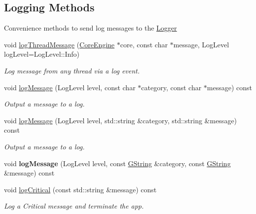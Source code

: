 \subsection*{Logging Methods}
\label{_amgrpef874cc21cf638ab7bb558a628e3450c}%
Convenience methods to send log messages to the \mbox{\hyperlink{classrev_1_1_logger}{Logger}} \begin{DoxyCompactItemize}
\item 
\mbox{\label{classrev_1_1_object_a01101d7b1f4b4e69487a97428902a8f6}} 
void \mbox{\hyperlink{classrev_1_1_object_a01101d7b1f4b4e69487a97428902a8f6}{log\+Thread\+Message}} (\mbox{\hyperlink{classrev_1_1_core_engine}{Core\+Engine}} $\ast$core, const char $\ast$message, Log\+Level log\+Level=Log\+Level\+::\+Info)
\begin{DoxyCompactList}\small\item\em Log message from any thread via a log event. \end{DoxyCompactList}\item 
void \mbox{\hyperlink{classrev_1_1_object_a763fca366d830bfdab969e164420d7ed}{log\+Message}} (Log\+Level level, const char $\ast$category, const char $\ast$message) const
\begin{DoxyCompactList}\small\item\em Output a message to a log. \end{DoxyCompactList}\item 
void \mbox{\hyperlink{classrev_1_1_object_a9cd310753468f0e7e971931bc0bda991}{log\+Message}} (Log\+Level level, std\+::string \&category, std\+::string \&message) const
\begin{DoxyCompactList}\small\item\em Output a message to a log. \end{DoxyCompactList}\item 
\mbox{\label{classrev_1_1_object_a8c037633e41daed16dc3d7d24d7f2977}} 
void {\bfseries log\+Message} (Log\+Level level, const \mbox{\hyperlink{classrev_1_1_g_string}{G\+String}} \&category, const \mbox{\hyperlink{classrev_1_1_g_string}{G\+String}} \&message) const
\item 
void \mbox{\hyperlink{classrev_1_1_object_a6dc5b38567e6a0b21617a3951ebcc228}{log\+Critical}} (const std\+::string \&message) const
\begin{DoxyCompactList}\small\item\em Log a Critical message and terminate the app. \end{DoxyCompactList}\item 

\end{DoxyCompactItemize}
